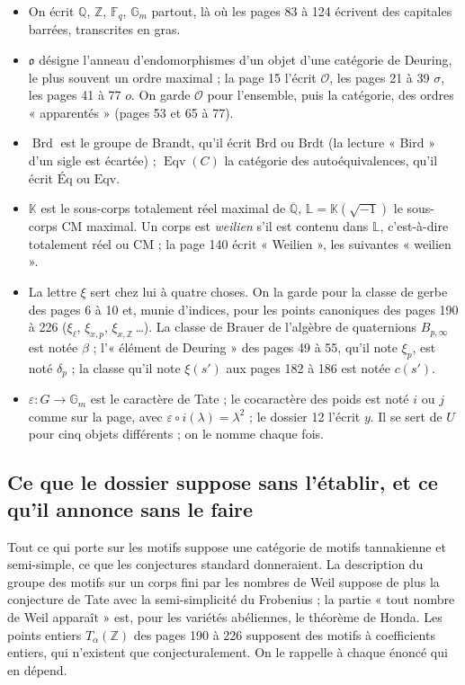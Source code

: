 \documentclass[11pt,a4paper]{article}
\begin{document}
\begin{itemize}
  \item On écrit $\mathbb{Q}$, $\mathbb{Z}$, $\mathbb{F}_{q}$,
  $\mathbb{G}_{m}$ partout, là où les pages 83 à 124 écrivent des capitales
  barrées, transcrites en gras.
  \item $\mathfrak{o}$ désigne l'anneau d'endomorphismes d'un objet d'une
  catégorie de Deuring, le plus souvent un ordre maximal ; la page 15 l'écrit
  $\mathcal{O}$, les pages 21 à 39 $\sigma$, les pages 41 à 77 $o$. On garde
  $\mathcal{O}$ pour l'ensemble, puis la catégorie, des ordres
  « apparentés » (pages 53 et 65 à 77).
  \item $\operatorname{Brd}$ est le groupe de Brandt, qu'il écrit $\mathrm{Brd}$
  ou $\mathrm{Brdt}$ (la lecture « Bird » d'un sigle est écartée) ;
  $\operatorname{Eqv}(C)$ la catégorie des autoéquivalences, qu'il écrit
  $\text{Éq}$ ou $\mathrm{Eqv}$.
  \item $\mathbb{K}$ est le sous-corps totalement réel maximal de
  $\overline{\mathbb{Q}}$, $\mathbb{L} = \mathbb{K}(\sqrt{-1})$ le sous-corps
  CM maximal. Un corps est \emph{weilien} s'il est contenu dans $\mathbb{L}$,
  c'est-à-dire totalement réel ou CM ; la page 140 écrit « Weilien », les
  suivantes « weilien ».
  \item La lettre $\xi$ sert chez lui à quatre choses. On la garde pour la
  classe de gerbe des pages 6 à 10 et, munie d'indices, pour les points
  canoniques des pages 190 à 226 ($\xi_{\ell}$, $\xi_{x,p}$,
  $\xi_{x,\mathbb{Z}}$\,…). La classe de Brauer de l'algèbre de quaternions
  $B_{p,\infty}$ est notée $\beta$ ; l'« élément de Deuring » des pages 49 à
  55, qu'il note $\xi_{p}$, est noté $\delta_{p}$ ; la classe qu'il note
  $\xi(s')$ aux pages 182 à 186 est notée $c(s')$.
  \item $\varepsilon \colon G \to \mathbb{G}_{m}$ est le caractère de Tate ;
  le cocaractère des poids est noté $i$ ou $j$ comme sur la page, avec
  $\varepsilon \circ i (\lambda) = \lambda^{2}$ ; le dossier 12 l'écrit $y$.
  Il se sert de $U$ pour cinq objets différents ; on le nomme chaque fois.
\end{itemize}

\subsection*{Ce que le dossier suppose sans l'établir, et ce qu'il annonce
sans le faire}

Tout ce qui porte sur les motifs suppose une catégorie de motifs
tannakienne et semi-simple, ce que les conjectures standard donneraient. La
description du groupe des motifs sur un corps fini par les nombres de Weil
suppose de plus la conjecture de Tate avec la semi-simplicité du Frobenius ;
la partie « tout nombre de Weil apparaît » est, pour les variétés abéliennes,
le théorème de Honda. Les points entiers $T_{\alpha}(\mathbb{Z})$ des pages
190 à 226 supposent des motifs à coefficients entiers, qui n'existent que
conjecturalement. On le rappelle à chaque énoncé qui en dépend.
\end{document}

